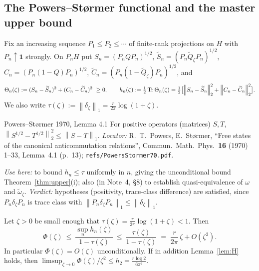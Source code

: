 \documentclass[11pt]{article}
\newcommand{\norm}[1]{\left\lVert #1\right\rVert}
\newcommand{\one}{\mathbf 1}
\newcommand{\Qt}{\widetilde Q}
\theoremstyle{definition}\newtheorem{problem}[theorem]{Problem}
\begin{document}
\subsection{The Powers--St\o rmer functional and the master upper bound}

\begin{definition}\label{def:hn}
Fix an increasing sequence \(P_1\le P_2\le\cdots\) of finite-rank projections on \(H\) with
\(P_n\uparrow\one\) strongly.  On \(P_nH\) put \(S_n=(P_nQP_n)^{1/2}\),
\(\widetilde S_n=(P_n\Qt_\zeta P_n)^{1/2}\), \(C_n=(P_n(1-Q)P_n)^{1/2}\),
\(\widetilde C_n=(P_n(1-\Qt_\zeta)P_n)^{1/2}\), and
\begin{equation}\label{eq:hn}
 \Theta_n(\zeta):=(S_n-\widetilde S_n)^2+(C_n-\widetilde C_n)^2\ \ge0,
 \qquad
 h_n(\zeta):=\tfrac12\Tr\Theta_n(\zeta)
 =\tfrac12\bigl[\norm{S_n-\widetilde S_n}_2^2+\norm{C_n-\widetilde C_n}_2^2\bigr].
\end{equation}
We also write \(\tau(\zeta):=\norm{\delta_\zeta}_1=\frac r{2\pi}\log(1+\zeta)\).
\end{definition}

\begin{citedbox}{Powers--St\o rmer 1970, Lemma 4.1}
For positive operators (matrices) \(S,T\),
\(\norm{S^{1/2}-T^{1/2}}_2^2\le\norm{S-T}_1\).
\emph{Locator:} R.~T.~Powers, E.~St\o rmer, ``Free states of the canonical anticommutation
relations'', Commun.\ Math.\ Phys.\ \textbf{16} (1970) 1--33, Lemma~4.1 (p.~13);
\texttt{refs/PowersStormer70.pdf}.

\begin{center}\end{center}

\emph{Use here:} to bound \(h_n\le\tau\) uniformly in \(n\), giving the unconditional bound
Theorem~\ref{thm:upper}(i); also (in Note~4, \S8) to establish quasi-equivalence of \(\omega\) and
\(\widetilde\omega_\zeta\).  \emph{Verdict:} hypotheses (positivity, trace-class difference) are
satisfied, since \(P_n\delta_\zeta P_n\) is trace class with
\(\norm{P_n\delta_\zeta P_n}_1\le\norm{\delta_\zeta}_1\).
\end{citedbox}

\begin{theorem}\label{thm:upper}
Let \(\zeta>0\) be small enough that \(\tau(\zeta)=\frac r{2\pi}\log(1+\zeta)<1\).  Then
\begin{equation}\label{eq:upper-master}
 \Phi(\zeta)\ \le\ \frac{\sup_n h_n(\zeta)}{1-\tau(\zeta)}\ \le\ \frac{\tau(\zeta)}{1-\tau(\zeta)}
 \;=\;\frac{r}{2\pi}\,\zeta+O(\zeta^2).
\end{equation}
In particular \(\Phi(\zeta)=O(\zeta)\) unconditionally.  If in addition
Lemma~\ref{lem:H} holds, then \(\limsup_{\zeta\to0}\Phi(\zeta)/\zeta^2\le h_2=\frac{r\log2}{6\pi^2}\).
\end{theorem}
\end{document}
